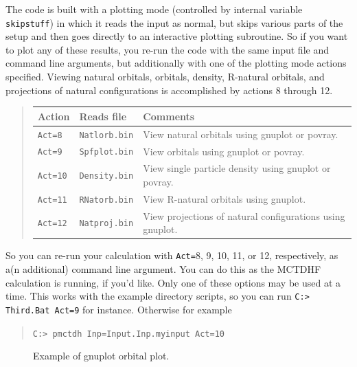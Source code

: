 \documentclass[10pt,leqno, oneside]{book}
\begin{document}
The code is built with a plotting mode (controlled by internal variable \verb#skipstuff#) in which it reads the input as normal, but skips various parts of the setup and then goes directly to an interactive plotting subroutine.   So if you want to plot any of these results, you re-run the code with the same input file and command line arguments, but additionally with one of the plotting mode actions specified.  Viewing natural orbitals, orbitals, density, R-natural orbitals, and projections of natural configurations is accomplished by actions 8 through 12.  
\begin{quote}
\begin{tabular}{lll}
Action & Reads file & Comments \\
\hline
\verb#Act=8# & \verb#Natlorb.bin# & View natural orbitals using gnuplot or povray. \\
\verb#Act=9# & \verb#Spfplot.bin# & View orbitals using gnuplot or povray. \\
\verb#Act=10# & \verb#Density.bin# & View single particle density using gnuplot or povray. \\
\verb#Act=11# & \verb#RNatorb.bin# & View R-natural orbitals using gnuplot. \\
\verb#Act=12# & \verb#Natproj.bin# & View projections of natural configurations using gnuplot. \\
\end{tabular}
\end{quote}
So you can re-run your calculation with \verb#Act=#8, 9, 10, 11, or 12, respectively, as a(n additional) command line argument.  You can do this as the MCTDHF calculation is running, if you'd like.  Only one of these options may be used at a time.  This works with the example directory scripts, so you can run \verb#C:> Third.Bat Act=9# for instance.  Otherwise for example
\begin{quote}
\verb#C:> pmctdh Inp=Input.Inp.myinput Act=10#
\end{quote}




\begin{figure}
\begin{center}
\end{center}
\caption{Example of gnuplot orbital plot.\label{plotfig}}
\end{figure}
\end{document}

